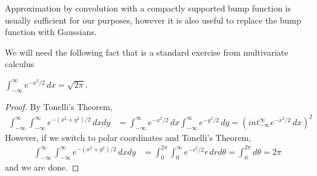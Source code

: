 Approximation by convolution with a compactly supported bump function
is usually sufficient for our purposes, however it is also useful to
replace the bump function with Gaussians.  

We will need the following fact that is a standard exercise from multivariate calculus
\begin{lem}\label{IntegralGaussian}$\int_{-\infty}^\infty e^{-x^2/2}\, dx = \sqrt{2\pi}$.
\end{lem}
\begin{proof}
By Tonelli's Theorem,
\begin{align*}
\int_{-\infty}^\infty \int_{-\infty}^\infty e^{-(x^2 + y^2)/2} \, dxdy
&= \int_{-\infty}^\infty e^{-x^2/2} \,
dx \int_{-\infty}^\infty e^{-y^2/2} \,
dy = \left(int_{-\infty}^\infty e^{-x^2/2} \,
dx \right)^2
\end{align*}
However, if we switch to polar coordinates and Tonelli's Theorem,
\begin{align*}
\int_{-\infty}^\infty \int_{-\infty}^\infty e^{-(x^2 + y^2)/2} \, dxdy
&= \int_{0}^{2\pi} \int_{0}^\infty e^{-r^2/2} r \, dr d\theta =
\int_{0}^{2\pi} d\theta = 2\pi
\end{align*}
and we are done.
\end{proof}

